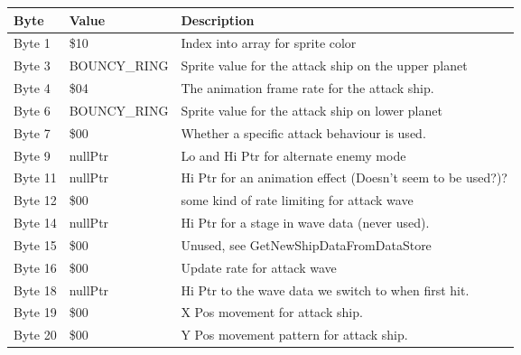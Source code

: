 \begin{figure}[H]
  {
  \setlength{\tabcolsep}{3.0pt}
  \setlength\cmidrulewidth{\heavyrulewidth} %
  \begin{adjustbox}{width=12cm}

\begin{tabular}{lll}
\toprule
 Byte    & Value                      & Description                                                        \\
\midrule
 Byte 1  & \$10                        & Index into array for sprite color                                  \\
 Byte 3  & BOUNCY\_RING                & Sprite value for the attack ship on the upper planet               \\
 Byte 4  & \$04                        & The animation frame rate for the attack ship.                      \\
 Byte 6  & BOUNCY\_RING                & Sprite value for the attack ship on lower planet                   \\
 Byte 7  & \$00                        & Whether a specific attack behaviour is used.                       \\
 Byte 9  & nullPtr                    & Lo and Hi Ptr for alternate enemy mode                             \\
 Byte 11 & nullPtr                    & Hi Ptr for an animation effect (Doesn't seem to be used?)?         \\
 Byte 12 & \$00                        & some kind of rate limiting for attack wave                         \\
 Byte 14 & nullPtr                    & Hi Ptr for a stage in wave data (never used).                      \\
 Byte 15 & \$00                        & Unused, see GetNewShipDataFromDataStore                            \\
 Byte 16 & \$00                        & Update rate for attack wave                                        \\
 Byte 18 & nullPtr                    & Hi Ptr to the wave data we switch to when first hit.               \\
 Byte 19 & \$00                        & X Pos movement for attack ship.                                    \\
 Byte 20 & \$00                        & Y Pos movement pattern for attack ship.                            \\

\end{tabular}
\end{adjustbox}}
\end{figure}
